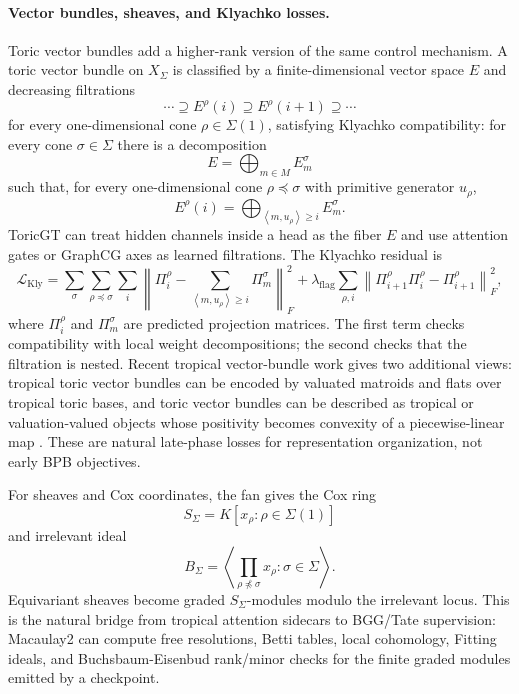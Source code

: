 \documentclass[11pt]{article}
\theoremstyle{definition}
\theoremstyle{plain}
\theoremstyle{remark}
\numberwithin{equation}{section}
\newcommand{\norm}[1]{\left\lVert #1\right\rVert}
\newcommand{\ip}[2]{\left\langle #1,#2\right\rangle}
\begin{document}
\paragraph{Vector bundles, sheaves, and Klyachko losses.}
Toric vector bundles add a higher-rank version of the same control mechanism.  A toric vector bundle on $X_\Sigma$ is classified by a finite-dimensional vector space $E$ and decreasing filtrations
\begin{equation}
  \cdots\supseteq E^\rho(i)\supseteq E^\rho(i+1)\supseteq\cdots
\end{equation}
for every one-dimensional cone $\rho\in\Sigma(1)$, satisfying Klyachko compatibility: for every cone $\sigma\in\Sigma$ there is a decomposition
\begin{equation}
  E=\bigoplus_{m\in M}E_m^\sigma
\end{equation}
such that, for every one-dimensional cone $\rho\preceq\sigma$ with primitive generator $u_\rho$,
\begin{equation}
  E^\rho(i)=
  \bigoplus_{\ip{m}{u_\rho}\ge i}E_m^\sigma.
\end{equation}
ToricGT can treat hidden channels inside a head as the fiber $E$ and use attention gates or GraphCG axes as learned filtrations.  The Klyachko residual is
\begin{equation}
  \mathcal L_{\mathrm{Kly}}
  =
  \sum_{\sigma}\sum_{\rho\preceq\sigma}\sum_i
  \left\|
    \Pi^\rho_i
    -
    \sum_{\ip{m}{u_\rho}\ge i}\Pi_m^\sigma
  \right\|_F^2
  +
  \lambda_{\mathrm{flag}}
  \sum_{\rho,i}\norm{\Pi^\rho_{i+1}\Pi^\rho_i-\Pi^\rho_{i+1}}_F^2,
\end{equation}
where $\Pi^\rho_i$ and $\Pi_m^\sigma$ are predicted projection matrices.  The first term checks compatibility with local weight decompositions; the second checks that the filtration is nested.  Recent tropical vector-bundle work gives two additional views: tropical toric vector bundles can be encoded by valuated matroids and flats over tropical toric bases, and toric vector bundles can be described as tropical or valuation-valued objects whose positivity becomes convexity of a piecewise-linear map \cite{khanmaclagan2024tropicalbundles,junminchevatolliver2023tropicalschemes,kavehmanon2023toricbundles}.  These are natural late-phase losses for representation organization, not early BPB objectives.

For sheaves and Cox coordinates, the fan gives the Cox ring
\begin{equation}
  S_\Sigma=K[x_\rho:\rho\in\Sigma(1)]
\end{equation}
and irrelevant ideal
\begin{equation}
  B_\Sigma=
  \left\langle
    \prod_{\rho\not\preceq\sigma}x_\rho:\sigma\in\Sigma
  \right\rangle.
\end{equation}
Equivariant sheaves become graded $S_\Sigma$-modules modulo the irrelevant locus.  This is the natural bridge from tropical attention sidecars to BGG/Tate supervision: Macaulay2 can compute free resolutions, Betti tables, local cohomology, Fitting ideals, and Buchsbaum-Eisenbud rank/minor checks for the finite graded modules emitted by a checkpoint.
\end{document}

